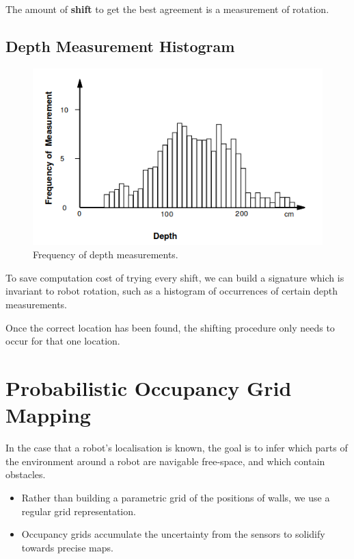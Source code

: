 \documentclass[11pt]{article}
\begin{document}
The amount of \textbf{shift} to get the best agreement is a measurement of rotation.

\subsection{Depth Measurement Histogram}
\begin{figure}[h]
  \caption{Frequency of depth measurements.}
  \includegraphics[scale=0.4]{freqdepth}
  \centering
\end{figure}
To save computation cost of trying every shift, we can build a signature which is invariant to robot rotation, such as a histogram of occurrences of certain depth measurements.

Once the correct location has been found, the shifting procedure only needs to occur for that one location.

\section{Probabilistic Occupancy Grid Mapping}
In the case that a robot's localisation is known, the goal is to infer which parts of the environment around a robot are navigable free-space, and which contain obstacles.

\begin{itemize}
  \item Rather than building a parametric grid of the positions of walls, we use a regular grid representation.
  \item Occupancy grids accumulate the uncertainty from the sensors to solidify towards precise maps.
\end{itemize}
\end{document}
